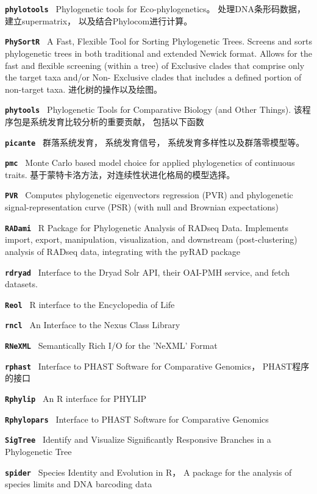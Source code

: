 \documentclass[10pt,landscape]{article}
\newcommand{\bcode}[1]{\texttt{\textbf{#1}}}
\begin{document}
\begin{CJK}{UTF8}{gbsn}
\begin{multicols}{3}
\bcode{phylotools     } Phylogenetic tools for Eco-phylogenetics。 处理DNA条形码数据， 建立supermatrix， 以及结合Phylocom进行计算。 

\bcode{PhySortR       } A Fast, Flexible Tool for Sorting Phylogenetic Trees. Screens and sorts phylogenetic trees in both traditional and extended Newick format. Allows for the fast and flexible screening (within a tree) of Exclusive clades that comprise only the target taxa and/or Non- Exclusive clades that includes a defined portion of non-target taxa. 进化树的操作以及绘图。

\bcode{phytools       }  Phylogenetic Tools for Comparative Biology (and Other Things). 该程序包是系统发育比较分析的重要贡献， 包括以下函数

\bcode{picante        } 群落系统发育， 系统发育信号， 系统发育多样性以及群落零模型等。

\bcode{pmc            } Monte Carlo based model choice for applied phylogenetics of continuous traits. 基于蒙特卡洛方法，对连续性状进化格局的模型选择。 

\bcode{PVR            } Computes phylogenetic eigenvectors regression (PVR) and phylogenetic signal-representation curve (PSR) (with null and Brownian expectations)

\bcode{RADami         } R Package for Phylogenetic Analysis of RADseq Data. Implements import, export, manipulation, visualization, and downstream (post-clustering) analysis of RADseq data, integrating with the pyRAD package

\bcode{rdryad         } Interface to the Dryad Solr API, their OAI-PMH service, and fetch datasets.

\bcode{Reol           } R interface to the Encyclopedia of Life

\bcode{rncl           } An Interface to the Nexus Class Library

\bcode{RNeXML         } Semantically Rich I/O for the 'NeXML' Format

\bcode{rphast         } Interface to PHAST Software for Comparative Genomics， PHAST程序的接口

\bcode{Rphylip        } An R interface for PHYLIP

\bcode{Rphylopars     } Interface to PHAST Software for Comparative Genomics

\bcode{SigTree        } Identify and Visualize Significantly Responsive Branches in a Phylogenetic Tree

\bcode{spider         } Species Identity and Evolution in R， A package for the analysis of species limits and DNA barcoding data


\end{multicols}
\end{CJK}
\end{document}
